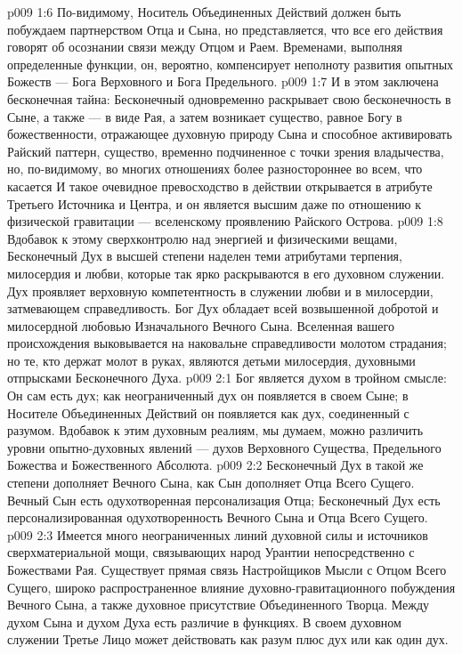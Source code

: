 \vs p009 1:6 По\hyp{}видимому, Носитель Объединенных Действий должен быть побуждаем партнерством Отца и Сына, но представляется, что все его действия говорят об осознании связи между Отцом и Раем. Временами, выполняя определенные функции, он, вероятно, компенсирует неполноту развития опытных Божеств --- Бога Верховного и Бога Предельного.
\vs p009 1:7 \pc И в этом заключена бесконечная тайна: Бесконечный одновременно раскрывает свою бесконечность в Сыне, а также --- в виде Рая, а затем возникает существо, равное Богу в божественности, отражающее духовную природу Сына и способное активировать Райский паттерн, существо, временно подчиненное с точки зрения владычества, но, по\hyp{}видимому, во многих отношениях более разностороннее во всем, что касается  И такое очевидное превосходство в действии открывается в атрибуте Третьего Источника и Центра, и он является высшим даже по отношению к физической гравитации --- вселенскому проявлению Райского Острова.
\vs p009 1:8 Вдобавок к этому сверхконтролю над энергией и физическими вещами, Бесконечный Дух в высшей степени наделен теми атрибутами терпения, милосердия и любви, которые так ярко раскрываются в его духовном служении. Дух проявляет верховную компетентность в служении любви и в милосердии, затмевающем справедливость. Бог Дух обладает всей возвышенной добротой и милосердной любовью Изначального Вечного Сына. Вселенная вашего происхождения выковывается на наковальне справедливости молотом страдания; но те, кто держат молот в руках, являются детьми милосердия, духовными отпрысками Бесконечного Духа.
\vs p009 2:1 Бог является духом в тройном смысле: Он сам есть дух; как неограниченный дух он появляется в своем Сыне; в Носителе Объединенных Действий он появляется как дух, соединенный с разумом. Вдобавок к этим духовным реалиям, мы думаем, можно различить уровни опытно\hyp{}духовных явлений --- духов Верховного Существа, Предельного Божества и Божественного Абсолюта.
\vs p009 2:2 Бесконечный Дух в такой же степени дополняет Вечного Сына, как Сын дополняет Отца Всего Сущего. Вечный Сын есть одухотворенная персонализация Отца; Бесконечный Дух есть персонализированная одухотворенность Вечного Сына и Отца Всего Сущего.
\vs p009 2:3 Имеется много неограниченных линий духовной силы и источников сверхматериальной мощи, связывающих народ Урантии непосредственно с Божествами Рая. Существует прямая связь Настройщиков Мысли с Отцом Всего Сущего, широко распространенное влияние духовно\hyp{}гравитационного побуждения Вечного Сына, а также духовное присутствие Объединенного Творца. Между духом Сына и духом Духа есть различие в функциях. В своем духовном служении Третье Лицо может действовать как разум плюс дух или как один дух.
